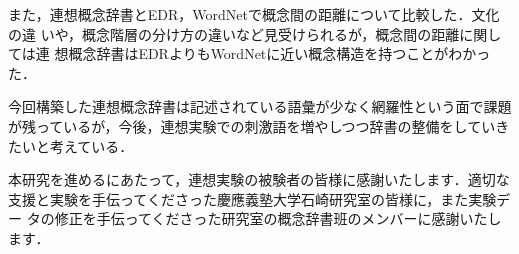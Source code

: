 また，連想概念辞書とEDR，WordNetで概念間の距離について比較した．文化の違
いや，概念階層の分け方の違いなど見受けられるが，概念間の距離に関しては連
想概念辞書はEDRよりもWordNetに近い概念構造を持つことがわかった．

今回構築した連想概念辞書は記述されている語彙が少なく網羅性という面で課題
が残っているが，今後，連想実験での刺激語を増やしつつ辞書の整備をしていき
たいと考えている．

\acknowledgment

本研究を進めるにあたって，連想実験の被験者の皆様に感謝いたします．適切な
支援と実験を手伝ってくださった慶應義塾大学石崎研究室の皆様に，また実験デー
タの修正を手伝ってくださった研究室の概念辞書班のメンバーに感謝いたします．





\begin{biography}

\end{biography}




